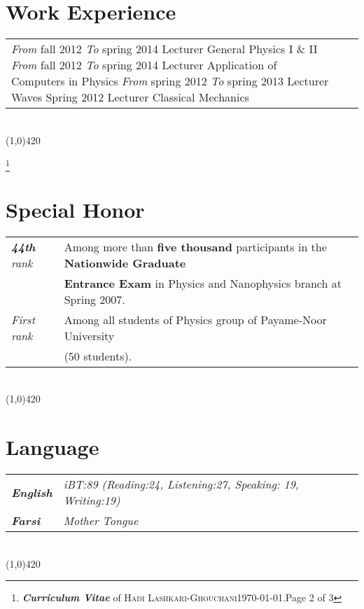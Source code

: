 \documentclass[10pt]{article}
\newcommand{\maxpages}{3}
\newcommand{\maxpages}{3}
\newcommand\HRule{\hspace*{.8cm}\line(1,0){420}\\}
\newenvironment{Record}[1]
{
    \vspace{-0.35cm}
    \section*{#1}
        \vspace{0.1cm}
        \begin{tabular}
}
{
        \end{tabular}\\
        \HRule
}
\newcommand{\FootNote}[1]{\let\thefootnote\relax\footnote{\textbf{\textit{Curriculum Vitae}} of \textsc{Hadi Lashkari-Ghouchani}\qquad\today.\qquad Page #1 of \maxpages}}
\begin{document}
\begin{Record}{Work Experience}{l l l}
    \WorkExperience{\href{http://www.sadjad.ac.ir/MainEn.aspx}{Sadjad University}}
        {\textit{From} fall 2012}
        {\textit{To} spring 2014}
        {Lecturer}
        {General Physics I \& II}
        {}{}{}{}%
    \WorkExperience{\href{http://en.pnu.ac.ir/Portal/Home}{Payame-Noor University}}
        {\textit{From} fall 2012}
        {\textit{To} spring 2014}
        {Lecturer}
        {Application of Computers in Physics}
        {}{}{}{}%
    \WorkExperience{\href{http://en.pnu.ac.ir/Portal/Home}{Payame-Noor University}}
        {\textit{From} spring 2012}
        {\textit{To} spring 2013}
        {Lecturer}
        {Waves}
        {}{}{}{}%
    \WorkExperience{\href{http://en.pnu.ac.ir/Portal/Home}{Payame-Noor University}}
        {Spring 2012}{}
        {Lecturer}
        {Classical Mechanics}
        {}{}{}{}%
\end{Record}


\FootNote{2}

\newcommand{\SpecialHonor}[3]{
    \textsl{ #1}&#2\\
    &#3\\
}
\begin{Record}{Special Honor}{l l}
    \SpecialHonor{\textbf{44th} rank}
        {Among more than \textbf{five thousand} participants in the \textbf{Nationwide Graduate}}
        {\textbf{Entrance Exam} in Physics and Nanophysics branch at Spring 2007.}%
    \SpecialHonor{First rank}
        {Among all students of Physics group of Payame-Noor University}
        {(50 students).}%
\end{Record}


\newcommand{\Language}[2]{
    \textbf{\textsl{#1}}&\textit{#2}\\
}
\begin{Record}{Language}{l l}
    \Language{English}
        {iBT:89 (Reading:24, Listening:27, Speaking: 19, Writing:19)}%
    \Language{Farsi}{Mother Tongue}%
\end{Record}

\end{document}
